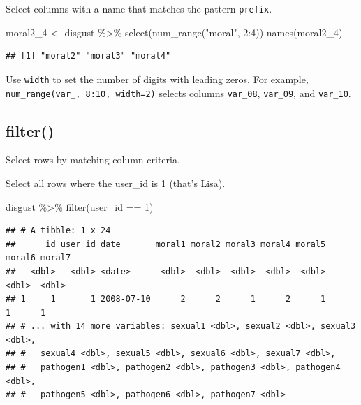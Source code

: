 \documentclass[
  oneside]{book}
\newenvironment{Shaded}{\begin{snugshade}}{\end{snugshade}}
\newcommand{\DecValTok}[1]{\textcolor[rgb]{0.00,0.00,0.81}{#1}}
\newcommand{\FunctionTok}[1]{\textcolor[rgb]{0.00,0.00,0.00}{#1}}
\newcommand{\NormalTok}[1]{#1}
\newcommand{\OtherTok}[1]{\textcolor[rgb]{0.56,0.35,0.01}{#1}}
\newcommand{\SpecialCharTok}[1]{\textcolor[rgb]{0.00,0.00,0.00}{#1}}
\newcommand{\StringTok}[1]{\textcolor[rgb]{0.31,0.60,0.02}{#1}}
\begin{document}
Select columns with a name that matches the pattern \texttt{prefix}.

\begin{Shaded}
\begin{Highlighting}[]
\NormalTok{moral2\_4 }\OtherTok{\textless{}{-}}\NormalTok{ disgust }\SpecialCharTok{\%\textgreater{}\%} \FunctionTok{select}\NormalTok{(}\FunctionTok{num\_range}\NormalTok{(}\StringTok{"moral"}\NormalTok{, }\DecValTok{2}\SpecialCharTok{:}\DecValTok{4}\NormalTok{))}
\FunctionTok{names}\NormalTok{(moral2\_4)}
\end{Highlighting}
\end{Shaded}

\begin{verbatim}
## [1] "moral2" "moral3" "moral4"
\end{verbatim}

\begin{info}
Use \texttt{width} to set the number of digits with leading
zeros. For example, \texttt{num\_range(\textquotesingle{}var\_\textquotesingle{},\ 8:10,\ width=2)} selects columns \texttt{var\_08}, \texttt{var\_09}, and \texttt{var\_10}.

\end{info}

\hypertarget{filter}{%
\subsection{filter()}\label{filter}}

Select rows by matching column criteria.

Select all rows where the user\_id is 1 (that's Lisa).

\begin{Shaded}
\begin{Highlighting}[]
\NormalTok{disgust }\SpecialCharTok{\%\textgreater{}\%} \FunctionTok{filter}\NormalTok{(user\_id }\SpecialCharTok{==} \DecValTok{1}\NormalTok{)}
\end{Highlighting}
\end{Shaded}

\begin{verbatim}
## # A tibble: 1 x 24
##      id user_id date       moral1 moral2 moral3 moral4 moral5 moral6 moral7
##   <dbl>   <dbl> <date>      <dbl>  <dbl>  <dbl>  <dbl>  <dbl>  <dbl>  <dbl>
## 1     1       1 2008-07-10      2      2      1      2      1      1      1
## # ... with 14 more variables: sexual1 <dbl>, sexual2 <dbl>, sexual3 <dbl>,
## #   sexual4 <dbl>, sexual5 <dbl>, sexual6 <dbl>, sexual7 <dbl>,
## #   pathogen1 <dbl>, pathogen2 <dbl>, pathogen3 <dbl>, pathogen4 <dbl>,
## #   pathogen5 <dbl>, pathogen6 <dbl>, pathogen7 <dbl>
\end{verbatim}
\end{document}
